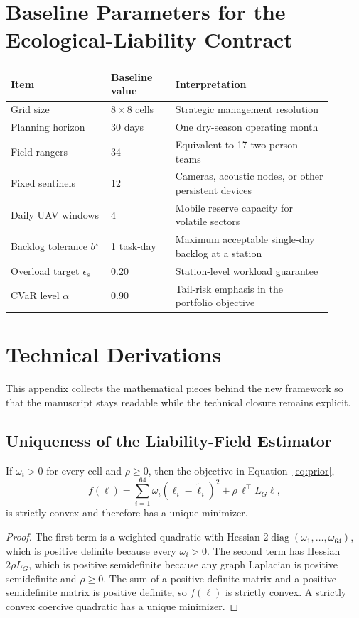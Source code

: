 \appendix
\section{Baseline Parameters for the Ecological-Liability Contract}
\begin{longtable}{p{0.28\linewidth}p{0.18\linewidth}p{0.44\linewidth}}
\toprule
Item & Baseline value & Interpretation \\
\midrule
Grid size & \(8\times 8\) cells & Strategic management resolution \\
Planning horizon & 30 days & One dry-season operating month \\
Field rangers & 34 & Equivalent to 17 two-person teams \\
Fixed sentinels & 12 & Cameras, acoustic nodes, or other persistent devices \\
Daily UAV windows & 4 & Mobile reserve capacity for volatile sectors \\
Backlog tolerance \(b^\star\) & 1 task-day & Maximum acceptable single-day backlog at a station \\
Overload target \(\epsilon_s\) & \(0.20\) & Station-level workload guarantee \\
CVaR level \(\alpha\) & \(0.90\) & Tail-risk emphasis in the portfolio objective \\
\bottomrule
\end{longtable}

\section{Technical Derivations}
This appendix collects the mathematical pieces behind the new framework so that the manuscript stays readable while the technical closure remains explicit.

\subsection{Uniqueness of the Liability-Field Estimator}
\begin{proposition}
\label{prop:field}
If \(\omega_i>0\) for every cell and \(\rho\ge 0\), then the objective in Equation~\eqref{eq:prior},
\[
f(\ell)=\sum_{i=1}^{64}\omega_i(\ell_i-\widetilde \ell_i)^2+\rho\,\ell^\top L_G\ell,
\]
is strictly convex and therefore has a unique minimizer.
\end{proposition}
\begin{proof}
The first term is a weighted quadratic with Hessian \(2\operatorname{diag}(\omega_1,\dots,\omega_{64})\), which is positive definite because every \(\omega_i>0\). The second term has Hessian \(2\rho L_G\), which is positive semidefinite because any graph Laplacian is positive semidefinite and \(\rho\ge 0\). The sum of a positive definite matrix and a positive semidefinite matrix is positive definite, so \(f(\ell)\) is strictly convex. A strictly convex coercive quadratic has a unique minimizer.
\end{proof}

